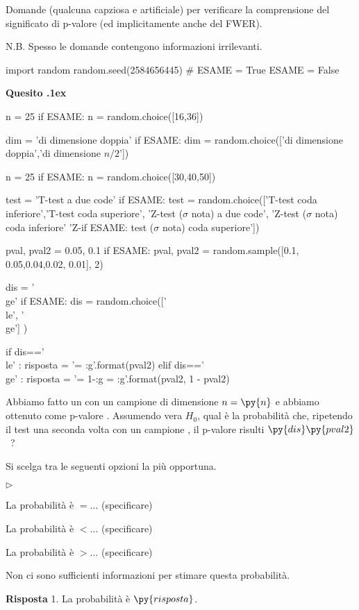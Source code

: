 \documentclass[11pt,twoside,a4paper]{article}
\newcommand{\mylabel}[1]{#1\hfill}
\renewenvironment{itemize}
  {\begin{list}{$\triangleright$}{%
   \setlength{\parskip}{0mm}
   \setlength{\topsep}{.4\baselineskip}
   \setlength{\rightmargin}{0mm}
   \setlength{\listparindent}{0mm}
   \setlength{\itemindent}{0mm}
   \setlength{\labelwidth}{2ex}
   \setlength{\itemsep}{.4\baselineskip}
   \setlength{\parsep}{0mm}
   \setlength{\partopsep}{0mm}
   \setlength{\labelsep}{1ex}
   \setlength{\leftmargin}{\labelwidth+\labelsep}
   \let\makelabel\mylabel}}{%
   \end{list}\vspace*{-1.3mm}}
\newcounter{quesito}
\newenvironment{xquestion}{\bigskip\addtocounter{quesito}{1}\par\textbf{Quesito \thequesito.\kern1ex}}{\vspace{\parskip}}
\newenvironment{answer}{\par\textbf{Risposta\quad}}{\vspace{\parskip}}
\begin{document}
\colorbox{blue!10}{\begin{minipage}{\textwidth}
Domande (qualcuna capziosa e artificiale) per verificare la comprensione del significato di p-valore (ed implicitamente anche del FWER).\bigskip

N.B. Spesso le domande contengono informazioni irrilevanti.
\end{minipage}}

\bigskip\bigskip

\begin{pycode}
import random
random.seed(2584656445)
# ESAME = True
ESAME = False
\end{pycode}

\begin{xquestion} %
\begin{pycode}
n = 25
if ESAME: n = random.choice([16,36])

dim = 'di dimensione doppia'
if ESAME: dim  = random.choice(['di dimensione doppia','di dimensione $n/2$'])

n = 25
if ESAME: n = random.choice([30,40,50])

test = 'T-test a due code'
if ESAME: test = random.choice(['T-test coda inferiore','T-test coda superiore', 'Z-test ($\sigma$ nota) a due code', 'Z-test ($\sigma$ nota) coda inferiore' 'Z-if ESAME: test ($\sigma$ nota) coda superiore'])

pval, pval2 = 0.05, 0.1
if ESAME: pval, pval2 = random.sample([0.1, 0.05,0.04,0.02, 0.01], 2)

dis = '\\ge'
if ESAME: dis = random.choice(['\\le', '\\ge'] )

if   dis=='\\le' : risposta = '= {:g}'.format(pval2)
elif dis=='\\ge' : risposta = '= 1-{:g} = {:g}'.format(pval2, 1 - pval2)
\end{pycode}
Abbiamo fatto un  con un campione di dimensione $n=\py{n}$ e abbiamo ottenuto come p-valore .
Assumendo vera $H_0$, qual è la probabilità che, ripetendo il test una seconda volta con un campione , il p-valore risulti $\py{dis}\py{pval2}$~?

Si scelga tra le seguenti opzioni la più opportuna.
\begin{itemize}
\item[1.] La probabilità è $=\dots$ (specificare)
\item[2.] La probabilità è $<\dots$ (specificare)
\item[3.] La probabilità è $>\dots$ (specificare)
\item[4.] Non ci sono sufficienti informazioni per stimare questa probabilità.
\end{itemize}
\begin{answer}
{\color{blue}1. La probabilità è $\py{risposta}$.}
\end{answer}
\end{xquestion}
\end{document}
